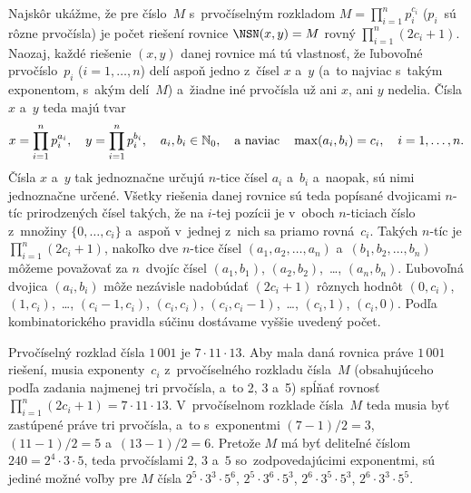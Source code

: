{%
Najskôr ukážme, že pre číslo~$M$ s~prvočíselným rozkladom
$M=\prod_{i=1}^np_i^{c_i}$ ($p_i$~sú rôzne prvočísla) je počet
riešení rovnice $\NSN(x,y)=M$ rovný
${\prod_{i=1}^n (2c_i+1)}$. Naozaj, každé riešenie $(x,y)$
danej rovnice má tú vlastnosť, že ľubovoľné prvočíslo~$p_i$
($i=1,\dots,n$) delí aspoň jedno z~čísel $x$ a~$y$ (a~to
najviac s~takým exponentom, s~akým delí~$M$) a~žiadne iné prvočísla
už ani $x$, ani $y$ nedelia. Čísla $x$ a~$y$ teda majú tvar
$$
x=\prod_{i=1}^np_i^{a_i}, \quad y=\prod_{i=1}^np_i^{b_i}, \quad a_i,b_i\in \Bbb N_0,
\quad \text{a~naviac} \quad \max(a_i,b_i)=c_i,\quad i=1,\dots,n.
$$
Čísla $x$ a~$y$ tak jednoznačne určujú $n$-tice
čísel $a_i$ a~$b_i$ a~naopak, sú nimi jednoznačne určené.
Všetky riešenia danej rovnice sú teda popísané dvojicami $n$-tíc
prirodzených čísel takých, že  na $i$-tej pozícii je v~oboch
$n$-ticiach číslo z~množiny $\{0,\dots, c_i\}$ a~aspoň v~jednej
z~nich sa priamo rovná~$c_i$. Takých $n$-tíc je $\prod_{i=1}^n
(2c_i+1)$, nakoľko dve \hbox{$n$-tice} čísel $(a_1,a_2,\dots,a_n)$
a~$(b_1,b_2,\dots,b_n)$ môžeme považovať za $n$~dvojíc čísel
$(a_1,b_1)$, $(a_2,b_2)$,~\dots, $(a_n,b_n)$. Ľubovoľná dvojica
$(a_i,b_i)$ môže nezávisle nadobúdať $(2c_i+1)$ rôznych hodnôt
$(0,c_i)$, $(1,c_i)$,~\dots, $(c_i-1,c_i)$, $(c_i,c_i)$,
$(c_i,c_i-1)$,~\dots, $(c_i,1)$, $(c_i,0)$. Podľa
kombinatorického pravidla súčinu dostávame vyššie uvedený počet.

Prvočíselný rozklad čísla $1\,001$ je $7\cdot11\cdot13$. Aby mala
daná rovnica práve $1\,001$ riešení, musia exponenty~$c_i$
z~prvočíselného rozkladu čísla~$M$ (obsahujúceho podľa zadania
najmenej tri prvočísla, a~to 2, 3 a~5) spĺňať rovnosť
$\prod_{i=1}^n (2c_i+1)=7\cdot11\cdot13$. V~prvočíselnom rozklade
čísla~$M$ teda musia byť zastúpené práve tri prvočísla, a~to
s~exponentmi $(7-1)/2=3$, $(11-1)/2=5$
a~$(13-1)/2=6$. Pretože $M$ má byť deliteľné číslom
$240=2^4\cdot 3\cdot 5$, teda prvočíslami $2$, $3$ a~$5$
so~zodpovedajúcimi exponentmi, sú jediné možné voľby pre $M$ čísla
$2^5\cdot 3^3\cdot5^6$, $2^5\cdot 3^6\cdot5^3$, $2^6\cdot
3^5\cdot5^3$, $2^6\cdot 3^3\cdot5^5$.}

